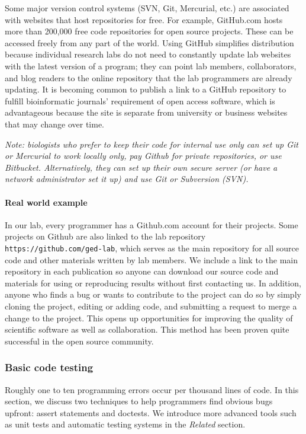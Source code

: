 \documentclass[ChapterTOCs,krantz2]{krantz} %
\begin{document}
Some major version control systems (SVN, Git, Mercurial, etc.) are associated with websites 
that host repositories for free.  For example, GitHub.com hosts more than 200,000 free code
repositories for open source projects. These can be accessed
freely from any part of the world.  Using GitHub
simplifies distribution because individual research labs do not need to
constantly update lab websites with the latest version of a program;
they can point lab members, collaborators, and blog readers to the online
repository that the lab programmers are already updating.  It is becoming 
common to publish a link to a GitHub repository to
fulfill bioinformatic journals' requirement of open access software, 
which is advantageous because the site is separate from
university or business websites that may change over time.  

\textsl{Note: biologists who prefer to keep their
code for internal use only can set up Git or Mercurial to work 
locally only, pay Github for private repositories, or use Bitbucket.  
Alternatively, they can set up their own secure
server (or have a network administrator set it up) and use
Git or Subversion (SVN).}

\paragraph{Real world example}

In our lab, every programmer has a Github.com account for their projects.
Some
projects on Github are also linked to the lab repository
\texttt{https://github.com/ged-lab}, which serves as the main repository for
all source code and other materials written by lab members. 
We include a link to the main repository in each
publication so anyone can download our source code and materials
for using or reproducing results without first contacting us. 
In addition, anyone who finds a bug or wants to contribute to
the project can do so by simply cloning the project, editing or adding code,
and submitting a request to merge a change to the project.
This opens up opportunities for improving the quality of scientific software
as well as collaboration.
This method has been proven quite successful in the open source community.

\subsubsection{Basic code testing}

Roughly one to ten programming errors occur 
per thousand lines of code\cite{Boehm2005,Ince2012}.  
In this section, we discuss two techniques to help
programmers find obvious bugs upfront: 
assert statements and doctests. We introduce more advanced
tools such as unit tests and automatic testing systems in the \emph{Related}
section.
\end{document}
